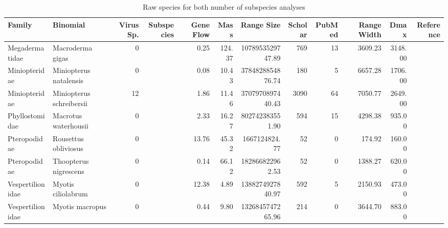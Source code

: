 




















\begin{landscape}
\begingroup\tiny
\begin{longtable}{@{}llrrrrrrrrrr@{}}
\caption{Raw species for both number of subspecies analyses} \\ 
  \toprule
Family & Binomial & Virus Sp. & Subspecies & Gene Flow & Mass & Range Size & Scholar & PubMed & Range Width & Dmax & Reference \\ 
  \midrule
Megadermatidae & Macroderma gigas &   0 &  & 0.25 & 124.37 & 1078953529747.89 & 769 &  13 & 3609.23 & 3148.00 & \cite{wilmer1999genetic} \\ 
  Miniopteridae & Miniopterus natalensis &   0 &  & 0.08 & 10.43 & 3784828854876.74 & 180 &   5 & 6657.28 & 1706.00 & \cite{miller2003strong} \\ 
  Miniopteridae & Miniopterus schreibersii &  12 &  & 1.86 & 11.46 & 3707970897440.43 & 3090 &  64 & 7050.77 & 2649.00 & \cite{witsenburg2015haemosporidian} \\ 
  Phyllostomidae & Macrotus waterhousii &   0 &  & 2.33 & 16.27 & 802742383551.90 & 594 &  15 & 4298.38 & 935.00 & \cite{burns2014correlates} \\ 
  Pteropodidae & Rousettus obliviosus &   0 &  & 13.76 & 45.32 & 1667124824.77 &  52 &   0 & 174.92 & 160.00 & \cite{goodman2010phylogeny} \\ 
  Pteropodidae & Thoopterus nigrescens &   0 &  & 0.14 & 66.12 & 182866822962.53 &  52 &   0 & 1388.27 & 620.00 & \cite{burns2014correlates} \\ 
  Vespertilionidae & Myotis ciliolabrum &   0 &  & 12.38 & 4.89 & 1388274927840.97 & 592 &   5 & 2150.93 & 473.00 & \cite{burns2014correlates} \\ 
  Vespertilionidae & Myotis macropus &   0 &  & 0.44 & 9.80 & 1326845747265.96 & 214 &   0 & 3644.70 & 883.00 & \cite{burns2014correlates} \\ 

\end{longtable}
\end{landscape}
